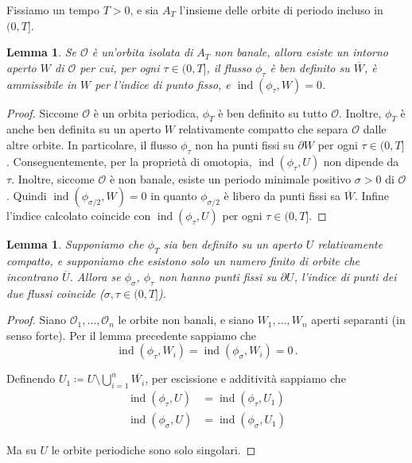 \documentclass[a4paper, 11pt]{article}
\theoremstyle{definition}
\theoremstyle{plain}
\newtheorem{Lemma}[Def]{Lemma}
\newcommand{\OO}{\mathcal{O}}
\newcommand{\cl}[1]{\overline{#1}}
\newcommand{\deff}{\coloneqq}
\DeclareMathOperator{\ind}{ind}
\begin{document}
Fissiamo un tempo $T > 0$, e sia $A_T$ l'insieme delle orbite di periodo incluso in $(0,T]$.
\begin{Lemma}
	Se $\OO$ è un'orbita isolata di $A_T$ non banale, allora esiste un intorno aperto $W$ di $\OO$ per cui, per ogni $\tau \in (0,T]$, il flusso $\phi_\tau$ è ben definito su $\cl{W}$, è ammissibile in $W$ per l'indice di punto fisso, e $\ind(\phi_\tau,W) = 0$.
\end{Lemma}
\begin{proof}
	Siccome $\OO$ è un orbita periodica, $\phi_T$ è ben definito su tutto $\OO$. Inoltre, $\phi_T$ è anche ben definita su un aperto $W$ relativamente compatto che separa $\OO$ dalle altre orbite. In particolare, il flusso $\phi_\tau$ non ha punti fissi su $\partial W$ per ogni $\tau \in (0,T]$. Conseguentemente, per la proprietà di omotopia, $\ind(\phi_\tau,U)$ non dipende da $\tau$. Inoltre, siccome $\OO$ è non banale, esiste un periodo minimale positivo $\sigma > 0$ di $\OO$. Quindi $\ind(\phi_{\sigma/2}, W) = 0$ in quanto $\phi_{\sigma/2}$ è libero da punti fissi sa $\overline{W}$. Infine l'indice calcolato coincide con $\ind(\phi_\tau,U)$ per ogni $\tau \in (0,T]$.
\end{proof}
\begin{Lemma}
	Supponiamo che $\phi_T$ sia ben definito su un aperto $U$ relativamente compatto, e supponiamo che esistono solo un numero finito di orbite che incontrano $\cl{U}$. Allora se $ \phi_\sigma$, $\phi_\tau$ non hanno punti fissi su $\partial U$, l'indice di punti dei due flussi coincide ($\sigma, \tau \in (0,T]$).
\end{Lemma}
\begin{proof}
	Siano $\OO_1, \dots, \OO_n$ le orbite non banali, e siano $W_1, \dots, W_n$ aperti separanti (in senso forte). Per il lemma precedente sappiamo che 
	\[
		\ind(\phi_\tau, W_i) = \ind(\phi_\sigma, W_i) = 0\,.
	\]
	
	Definendo $U_1 \deff U \setminus \bigcup_{i= 1}^n \cl{W_i}$, per escissione e additività  sappiamo che 
	\[
	\begin{split}
		\ind(\phi_\tau, U) &= \ind(\phi_\tau, U_1)\\
		\ind(\phi_\sigma, U) &= \ind(\phi_\sigma, U_1)
	\end{split}
	\]
	
	Ma su $U$ le orbite periodiche sono solo singolari.
\end{proof}

\printbibliography
\end{document}
